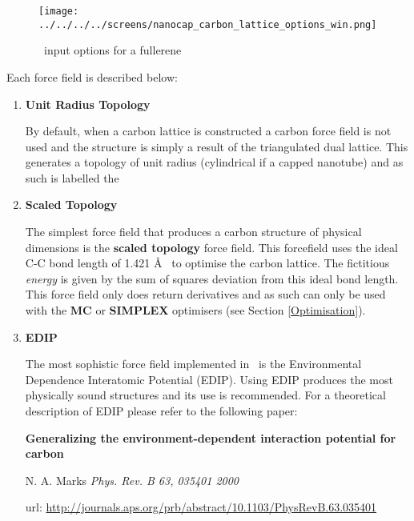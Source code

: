  \begin{figure}[h!]
\centering
\texttt{[image: ../../../../screens/nanocap\_carbon\_lattice\_options\_win.png]}
\caption{\nanocap~input options for a fullerene}
\label{carbonlatticeoptions}
\end{figure}

Each force field is described below:

 \begin{enumerate}
 
\item \textbf{Unit Radius Topology} 

By default, when a carbon lattice is constructed a carbon force field is not used and the structure is simply a result of the triangulated dual lattice. This generates a topology of unit radius (cylindrical if a capped nanotube) and as such is labelled the 

\item \textbf{Scaled Topology} 

The simplest force field that produces a carbon structure of physical dimensions is the \textbf{scaled topology} force field. This forcefield uses the ideal C-C bond length of 1.421 \AA~ to optimise the carbon lattice. The fictitious \textit{energy} is given by the sum of squares deviation from this ideal bond length. This force field only does return derivatives and as such can only be used with the \textbf{MC} or \textbf{SIMPLEX} optimisers (see Section \ref{Optimisation}).

\item \textbf{EDIP}

The most sophistic force field implemented in \nanocap~is the Environmental Dependence Interatomic Potential (EDIP). Using EDIP produces the most physically sound structures and its use is recommended. For a theoretical description of EDIP please refer to the following paper: 

\textbf{Generalizing the environment-dependent interaction potential for carbon}

N. A. Marks \textit{Phys. Rev. B 63, 035401 2000}

url: \url{http://journals.aps.org/prb/abstract/10.1103/PhysRevB.63.035401}

  
 \end{enumerate}
%


    

